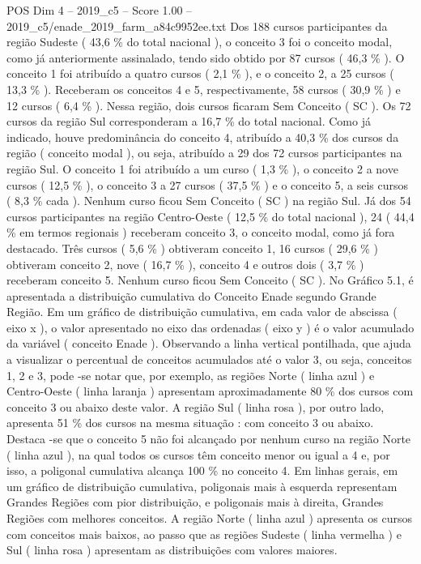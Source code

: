 \begin{textsample}{POS Dim 4 – 2019\_c5 – Score 1.00 – 2019\_c5/enade\_2019\_farm\_a84c9952ee.txt}
Dos 188 cursos participantes da região Sudeste ( 43,6 \% do total nacional ), o conceito 3 foi o conceito modal, como já anteriormente assinalado, tendo sido obtido por 87 cursos ( 46,3 \% ).
O conceito 1 foi atribuído a quatro cursos ( 2,1 \% ), e o conceito 2, a 25 cursos ( 13,3 \% ).
Receberam os conceitos 4 e 5, respectivamente, 58 cursos ( 30,9 \% ) e 12 cursos ( 6,4 \% ).
Nessa região, dois cursos ficaram Sem Conceito ( SC ).
Os 72 cursos da região Sul corresponderam a 16,7 \% do total nacional.
Como já indicado, houve predominância do conceito 4, atribuído a 40,3 \% dos cursos da região ( conceito modal ), ou seja, atribuído a 29 dos 72 cursos participantes na região Sul.
O conceito 1 foi atribuído a um curso ( 1,3 \% ), o conceito 2 a nove cursos ( 12,5 \% ), o conceito 3 a 27 cursos ( 37,5 \% ) e o conceito 5, a seis cursos ( 8,3 \% cada ).
Nenhum curso ficou Sem Conceito ( SC ) na região Sul.
Já dos 54 cursos participantes na região Centro-Oeste ( 12,5 \% do total nacional ), 24 ( 44,4 \% em termos regionais ) receberam conceito 3, o conceito modal, como já fora destacado.
Três cursos ( 5,6 \% ) obtiveram conceito 1, 16 cursos ( 29,6 \% ) obtiveram conceito 2, nove ( 16,7 \% ), conceito 4 e outros dois ( 3,7 \% ) receberam conceito 5.
Nenhum curso ficou Sem Conceito ( SC ).
No Gráfico 5.1, é apresentada a distribuição cumulativa do Conceito Enade segundo Grande Região.
Em um gráfico de distribuição cumulativa, em cada valor de abscissa ( eixo x ), o valor apresentado no eixo das ordenadas ( eixo y ) é o valor acumulado da variável ( conceito Enade ).
Observando a linha vertical pontilhada, que ajuda a visualizar o percentual de conceitos acumulados até o valor 3, ou seja, conceitos 1, 2 e 3, pode -se notar que, por exemplo, as regiões Norte ( linha azul ) e Centro-Oeste ( linha laranja ) apresentam aproximadamente 80 \% dos cursos com conceito 3 ou abaixo deste valor.
A região Sul ( linha rosa ), por outro lado, apresenta 51 \% dos cursos na mesma situação : com conceito 3 ou abaixo.
Destaca -se que o conceito 5 não foi alcançado por nenhum curso na região Norte ( linha azul ), na qual todos os cursos têm conceito menor ou igual a 4 e, por isso, a poligonal cumulativa alcança 100 \% no conceito 4.
Em linhas gerais, em um gráfico de distribuição cumulativa, poligonais mais à esquerda representam Grandes Regiões com pior distribuição, e poligonais mais à direita, Grandes Regiões com melhores conceitos.
A região Norte ( linha azul ) apresenta os cursos com conceitos mais baixos, ao passo que as regiões Sudeste ( linha vermelha ) e Sul ( linha rosa ) apresentam as distribuições com valores maiores.

\end{textsample}
